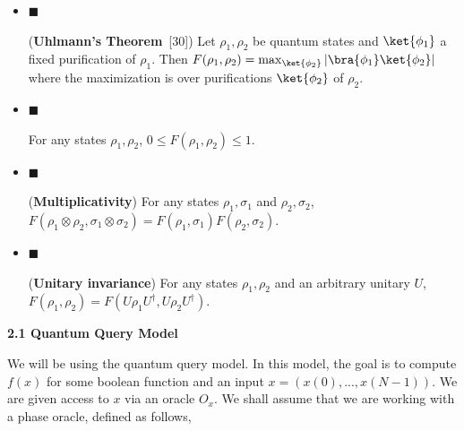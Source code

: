 \documentclass[10pt,a4paper]{article}
\begin{document}
\begin{itemize}


\item[] 
$\blacksquare$ 


(\textbf{Uhlmann’s Theorem} [30]) Let $\rho_{1},\rho_{2}$ be quantum states and $\ket{\phi_{1}}$ a fixed purification of $\rho_{1}$. Then $F(\rho_{1},\rho_{2})=\max_{\ket{\phi_{2}}}\left|\bra{\phi_{1}}\ket{\phi_{2}}\right|$ where the maximization is over purifications $\ket{\phi_{2}}$ of $\rho_{2}$.\par





\item[] 
$\blacksquare$ 


For any states $\rho_{1},\rho_{2}$, $0\leq F(\rho_{1},\rho_{2})\leq 1$.\par





\item[] 
$\blacksquare$ 


(\textbf{Multiplicativity}) For any states $\rho_{1},\sigma_{1}$ and $\rho_{2},\sigma_{2}$, $F(\rho_{1}\otimes\rho_{2},\sigma_{1}\otimes\sigma_{2})=F(\rho_{1},\sigma_{1})F(\rho_{2},\sigma_{2})$.\par





\item[] 
$\blacksquare$ 


(\textbf{Unitary invariance}) For any states $\rho_{1},\rho_{2}$ and an arbitrary unitary $U$, $F(\rho_{1},\rho_{2})=F(U\rho_{1}U^{\dagger},U\rho_{2}U^{\dagger})$.\par





\end{itemize}




\par\medskip\noindent\textbf{
2.1 Quantum Query Model}\par




We will be using the quantum query model. In this model, the goal is to compute $f(x)$ for some boolean function and an input $x=(x(0),...,x(N-1))$. We are given access to $x$ via an oracle $O_{x}$. We shall assume that we are working with a phase oracle, defined as follows,\par
\end{document}
